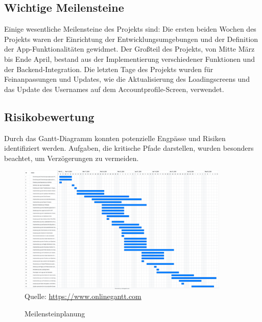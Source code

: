 \subsection{Wichtige Meilensteine}
Einige wesentliche Meilensteine des Projekts sind:
Die ersten beiden Wochen des Projekts waren der Einrichtung der Entwicklungsumgebungen und der Definition der App-Funktionalitäten gewidmet.
Der Großteil des Projekts, von Mitte März bis Ende April, bestand aus der Implementierung verschiedener Funktionen und der Backend-Integration.
Die letzten Tage des Projekts wurden für Feinanpassungen und Updates, wie die Aktualisierung des Loadingscreens und das Update des Usernames auf dem Accountprofile-Screen, verwendet.

\subsection{Risikobewertung}
Durch das Gantt-Diagramm konnten potenzielle Engpässe und Risiken identifiziert werden.
Aufgaben, die kritische Pfade darstellen, wurden besonders beachtet, um Verzögerungen zu vermeiden.

\begin{figure}[H]
    \caption[Meilensteinplanung]{Meilensteinplanung}
    \includegraphics[width=0.9\textwidth]{assets/figures/STH GANTT Diagramm.png}
    \\
    Quelle: \url{https://www.onlinegantt.com}
\end{figure}